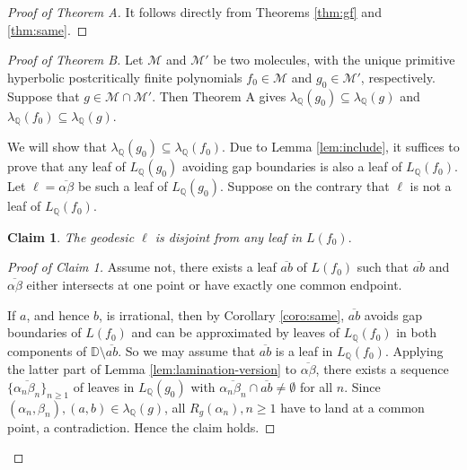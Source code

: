 \documentclass[a4paper,reqno,times, 11pt]{amsart}
\theoremstyle{remark}
\theoremstyle{plain}
\numberwithin{equation}{section}
\def\MMMM{{\cal M}}
\def\MMMM{\mathscr M}
\def\D{\mathbb D}
\def\Q{\mathbb Q}
\def\cal{\mathcal}
\begin{document}
\begin{proof}[Proof of Theorem A]
	It follows directly from Theorems \ref{thm:gf} and  \ref{thm:same}.
\end{proof}

\begin{proof}[{Proof of Theorem B}]
	Let $\MMMM$ and $\MMMM'$ be two molecules, with the unique primitive hyperbolic postcritically finite polynomials  $f_0\in\MMMM$ and $g_0\in\MMMM'$, respectively. Suppose that $g\in\MMMM\cap\MMMM'$. Then Theorem A gives $\lambda_\Q(g_0)\subseteq \lambda_\Q(g)$ and $\lambda_\Q(f_0)\subseteq \lambda_\Q(g)$.\vspace{2pt}
	
	We will show that $\lambda_\Q(g_0)\subseteq \lambda_\Q(f_0)$. Due to Lemma \ref{lem:include}, it suffices to prove that  any leaf   of $L_\Q(g_0)$ avoiding gap boundaries is also a leaf of $L_\Q(f_0)$.
Let $\ell=\overline{\alpha\beta}$ be such a leaf of $L_\Q(g_0)$. Suppose on the contrary that $\ell$ is not a leaf of $L_\Q(f_0)$.\vspace{7pt}

{\bf Claim 1}.	\emph{The geodesic  $\ell$ is disjoint from   any leaf in $L(f_0)$}.  
\begin{proof}[Proof of Claim 1]
Assume not, there exists a leaf $\overline{ab}$ of $L(f_0)$ such that  $\overline{ab}$ and $\overline{\alpha\beta}$ either intersects at one point or have exactly one common endpoint. 

If $a$, and hence $b$, is irrational, then by Corollary \ref{coro:same}, $\overline{ab}$ avoids gap boundaries of $L(f_0)$ and  can be approximated by leaves of $L_\Q(f_0)$ in both components of $\D\setminus \overline{ab}$. So we may assume that $\overline{ab}$ is a leaf in $L_\Q(f_0)$. 
 Applying the latter part of Lemma \ref{lem:lamination-version} to $\overline{\alpha\beta}$, there exists  a sequence $\{\overline{\alpha_n\beta_n}\}_{n\geq1}$ of leaves in $L_\mathbb{Q}(g_0)$ with $\overline{\alpha_n\beta_n} \cap \overline{ab} \neq \emptyset$ for all $n$. Since $(\alpha_n,\beta_n), (a,b) \in \lambda_\mathbb{Q}(g)$, all $R_g(\alpha_n),n\geq1$ have to land at a common point, a contradiction. Hence the claim holds.
 \end{proof}
		

\end{proof}
\end{document}
